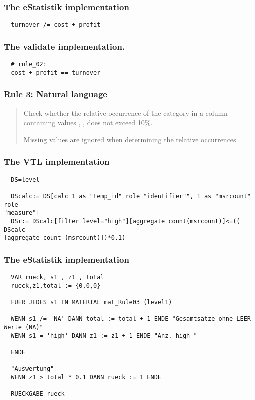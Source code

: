 \subsubsection*{The eStatistik implementation}
\begin{verbatim}
  turnover /= cost + profit
\end{verbatim}
\subsubsection*{The validate implementation.}
\begin{verbatim}
  # rule_02:
  cost + profit == turnover
\end{verbatim}


\newpage

\subsubsection*{  Rule 3: Natural language}
\begin{quote}


Check whether the relative occurrence of the category  in a column containing values , ,  does not exceed 10\%.

Missing values are ignored when determining the relative occurrences.


\end{quote}
\subsubsection*{The VTL implementation}
\begin{verbatim}
  DS=level

  DScalc:= DS[calc 1 as "temp_id" role "identifier"", 1 as "msrcount" role
"measure"]
  DSr:= DScalc[filter level="high"][aggregate count(msrcount)]<=(( DScalc
[aggregate count (msrcount)])*0.1)
\end{verbatim}
\subsubsection*{The eStatistik implementation}
\begin{verbatim}
  VAR rueck, s1 , z1 , total
  rueck,z1,total := {0,0,0}

  FUER JEDES s1 IN MATERIAL mat_Rule03 (level1)

  WENN s1 /= 'NA' DANN total := total + 1 ENDE "Gesamtsätze ohne LEER Werte (NA)"
  WENN s1 = 'high' DANN z1 := z1 + 1 ENDE "Anz. high "

  ENDE

  "Auswertung"
  WENN z1 > total * 0.1 DANN rueck := 1 ENDE

  RUECKGABE rueck
\end{verbatim}
